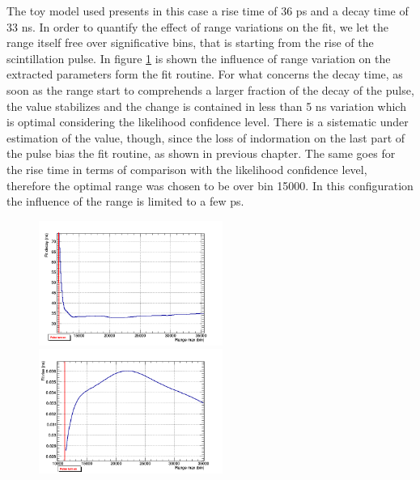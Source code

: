 The toy model used presents in this case a rise time of 36 ps and a decay time of 33 ns. 
In order to quantify the effect of range variations on the fit, we let the range itself free over significative bins, that is starting from the rise of the scintillation pulse.
In figure \ref{fig:range} is shown the influence of range variation on the extracted parameters form the fit routine.
For what concerns the decay time, as soon as the range start to comprehends a larger fraction of the decay of the pulse, the value stabilizes and the change is contained in less than 5 ns variation which is optimal considering the likelihood confidence level. There is a sistematic under estimation of the value, though, since the loss of indormation on the last part of the pulse bias the fit routine, as shown in previous chapter.
The same goes for the rise time in terms of comparison with the likelihood confidence level, therefore the optimal range was chosen to be over bin 15000. In this configuration the influence of the range is limited to a few ps.
\begin{figure}[htbp]
\begin{center}
\includegraphics[width=6cm]{../Pictures/Chapter_7/decay_range_2.png}
\includegraphics[width=6cm]{../Pictures/Chapter_7/rise_range_2.png}
\end{center}
\caption[]{}
\label{fig:range}
\end{figure}


